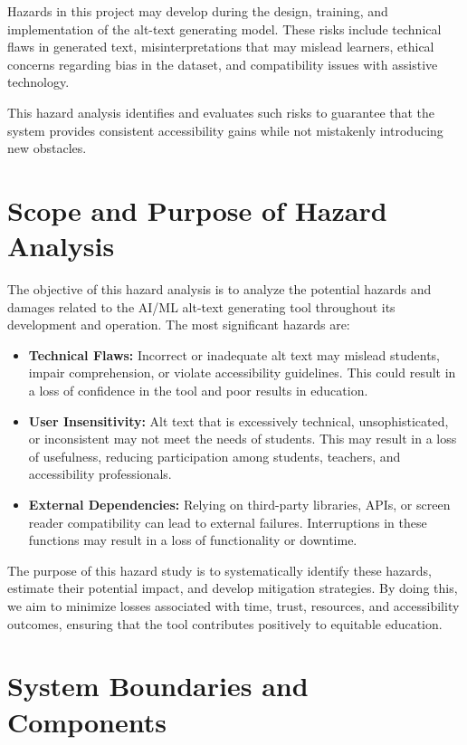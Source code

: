 \documentclass{article}
\begin{document}
Hazards in this project may develop during the design, training, and implementation of the alt-text generating model. These risks include technical flaws in generated text, misinterpretations that may mislead learners, ethical concerns regarding bias in the dataset, and compatibility issues with assistive technology.

This hazard analysis identifies and evaluates such risks to guarantee that the system provides consistent accessibility gains while not mistakenly introducing new obstacles.

\section{Scope and Purpose of Hazard Analysis}
The objective of this hazard analysis is to analyze the potential hazards and damages related to the AI/ML alt-text generating tool throughout its development and operation. The most significant hazards are:

\begin{itemize}
    \item \textbf{Technical Flaws:} Incorrect or inadequate alt text may mislead students, impair comprehension, or violate accessibility guidelines. This could result in a loss of confidence in the tool and poor results in education.
    \item \textbf{User Insensitivity:} Alt text that is excessively technical, unsophisticated, or inconsistent may not meet the needs of students. This may result in a loss of usefulness, reducing participation among students, teachers, and accessibility professionals.
    \item \textbf{External Dependencies:} Relying on third-party libraries, APIs, or screen reader compatibility can lead to external failures. Interruptions in these functions may result in a loss of functionality or downtime.
\end{itemize}

The purpose of this hazard study is to systematically identify these hazards, estimate their potential impact, and develop mitigation strategies. By doing this, we aim to minimize losses associated with time, trust, resources, and accessibility outcomes, ensuring that the tool contributes positively to equitable education.

\section{System Boundaries and Components}
\end{document}
